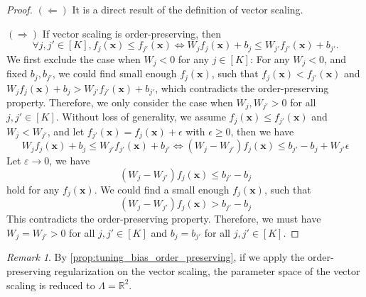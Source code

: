 \documentclass{article}
\newcommand{\1}{\mathbbm{1}}
\theoremstyle{plain}
\theoremstyle{definition}
\theoremstyle{remark}
\newtheorem{remark}[theorem]{Remark}
\begin{document}
\begin{proof}
    \textbf{\((\Leftarrow)\)}
    It is a direct result of the definition of vector scaling.

    \textbf{\((\Rightarrow)\)}
    If vector scaling is order-preserving, then
    \begin{equation*}
        \forall j, j'\in [K], f_{j}(\boldsymbol{x}) \leq f_{j'}(\boldsymbol{x}) \iff W_j f_{j}(\boldsymbol{x}) + b_j \leq W_{j'} f_{j'}(\boldsymbol{x}) + b_{j'}.
    \end{equation*}
    We first exclude the case when \(W_j <0\) for any \(j\in [K]\):
    For any \(W_j <0\), and fixed \(b_j, b_{j'}\), we could find small enough \(f_{j}(\boldsymbol{x})\), such that \(f_{j}(\boldsymbol{x}) < f_{j'}(\boldsymbol{x})\) and \(W_j f_{j}(\boldsymbol{x}) + b_j > W_{j'} f_{j'}(\boldsymbol{x}) + b_{j'}\), which contradicts the order-preserving property.
    Therefore, we only consider the case when \(W_j, W_{j'} >0\) for all \(j, j'\in [K]\). 
    Without loss of generality, we assume \(f_{j}(\boldsymbol{x}) \leq f_{j'}(\boldsymbol{x})\) and \(W_j < W_{j'}\), and let \(f_{j'}(\boldsymbol{x}) = f_{j}(\boldsymbol{x}) + \epsilon\) with \(\epsilon \geq 0\), then we have
    \begin{equation*}
        W_j f_{j}(\boldsymbol{x}) + b_j \leq W_{j'} f_{j'}(\boldsymbol{x}) + b_{j'} \iff 
        (W_j - W_{j'})f_{j}(\boldsymbol{x})  \leq b_{j'} - b_j+ W_{j'} \epsilon
    \end{equation*}
    Let \(\varepsilon \to 0\), we have
    \begin{equation*}
        (W_j - W_{j'})f_{j}(\boldsymbol{x})  \leq b_{j'} - b_j
    \end{equation*}
    hold for any \(f_{j}(\boldsymbol{x})\). We could find a small enough \(f_{j}(\boldsymbol{x})\), such that
    \begin{equation*}
        (W_j - W_{j'})f_{j}(\boldsymbol{x})  > b_{j'} - b_j
    \end{equation*}
    This contradicts the order-preserving property.
    Therefore, we must have \(W_j = W_{j'} >0\) for all \(j, j'\in [K]\) and \(b_j = b_{j'}\) for all \(j, j'\in [K]\).
\end{proof}

\begin{remark}
    By \cref{prop:tuning_bias_order_preserving}, if we apply the order-preserving regularization on the vector scaling, the parameter space of the vector scaling is reduced to \(\Lambda = \mathbb{R}^2\).
\end{remark}
\end{document}
